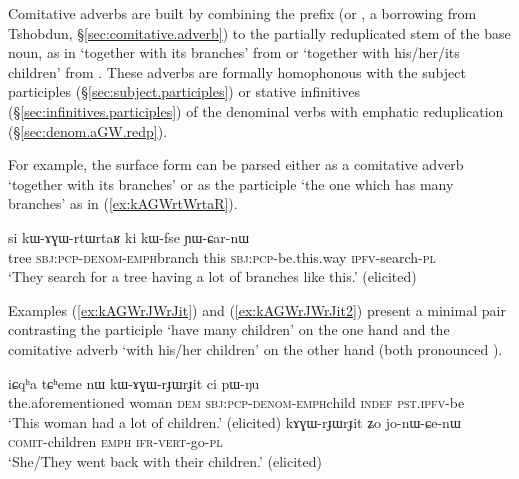 Comitative adverbs are built by combining the prefix   (or , a borrowing from Tshobdun, §\ref{sec:comitative.adverb}) to the partially reduplicated stem of the base noun, as in  `together with its branches'  from  or  `together with his/her/its children'  from . These adverbs are formally homophonous with the  subject participles (§\ref{sec:subject.participles}) or stative infinitives (§\ref{sec:infinitives.participles}) of the  denominal verbs with emphatic reduplication (§\ref{sec:denom.aGW.redp}).

For example, the surface form  can be parsed either as a comitative adverb  `together with its branches' or as the  participle  `the one which has many branches' as in (\ref{ex:kAGWrtWrtaR}).

  \begin{exe}
\ex \label{ex:kAGWrtWrtaR}
\gll   si kɯ-ɤɣɯ-rtɯ\redp{}rtaʁ ki kɯ-fse ɲɯ-ɕar-nɯ\\
  tree \textsc{sbj}:\textsc{pcp}-\textsc{denom}-\textsc{emph}\redp{}branch this \textsc{sbj}:\textsc{pcp}-be.this.way \textsc{ipfv}-search-\textsc{pl}\\
\glt `They search for a tree having a lot of branches like this.' (elicited)
\end{exe}

Examples (\ref{ex:kAGWrJWrJit}) and (\ref{ex:kAGWrJWrJit2}) present a minimal pair contrasting  the participle  `have many children' on the one hand and the comitative adverb  `with his/her children'  on the other hand (both pronounced ).

\begin{exe}
\ex 
\begin{xlist}
\ex \label{ex:kAGWrJWrJit}
\gll    iɕqʰa tɕʰeme nɯ kɯ-ɤɣɯ-rɟɯ\redp{}rɟit ci pɯ-ŋu \\
the.aforementioned woman \textsc{dem} \textsc{sbj}:\textsc{pcp}-\textsc{denom}-\textsc{emph}\redp{}child \textsc{indef} \textsc{pst}.\textsc{ipfv}-be \\
\glt `This woman had a lot of children.' (elicited)
\ex \label{ex:kAGWrJWrJit2}
\gll   kɤɣɯ-rɟɯ\redp{}rɟit ʑo jo-nɯ-ɕe-nɯ \\
\textsc{comit}-children \textsc{emph} \textsc{ifr}-\textsc{vert}-go-\textsc{pl} \\
\glt `She/They went back with their children.' (elicited)
\end{xlist}
\end{exe}

